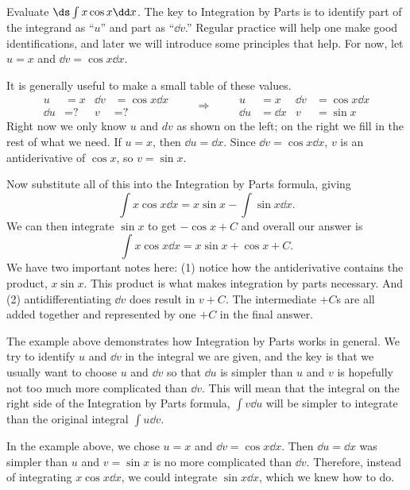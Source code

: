 \begin{example}\label{ex_ibp1}%
Evaluate $\ds\int x\cos{x}\dd x$.
\solution
The key to Integration by Parts is to identify part of the integrand as ``$u$'' and part as ``$\dd v$.'' Regular practice will help one make good identifications, and later we will introduce some principles that help. For now, let  $u=x$ and $\dd v=\cos x\dd x$.

It is generally useful to make a small table of these values.
\[
\begin{aligned}
u&= x & \dd v&=\cos x\dd x\\
\dd u&= \text{?} & v&=\text{?}
\end{aligned}
\qquad\Rightarrow\qquad
\begin{aligned}
u&= x & \dd v&=\cos x\dd x\\
\dd u&= \dd x & v&=\sin x
\end{aligned}
\]
Right now we only know $u$ and $dv$ as shown on the left; on the right we fill in the rest of what we need. If $u = x$, then $\dd u = \dd x$. Since $\dd v = \cos x\dd x$, $v$ is an antiderivative of $\cos x$, so $v = \sin x$.

Now substitute all of this into the Integration by Parts formula, giving
\[\int x\cos x\dd x = x\sin x - \int \sin x\dd x.\]
We can then integrate $\sin x$ to get $-\cos x + C$ and overall our answer is
\[\int x\cos x\dd x = x\sin x + \cos x + C.\]
We have two important notes here: (1) notice how the antiderivative contains the product, $x\sin x$. This product is what makes integration by parts necessary. And (2) antidifferentiating $\dd v$ does result in $v+C$. The intermediate $+C$s are all added together and represented by one $+C$ in the final answer.
\end{example}

The example above demonstrates how Integration by Parts works in general.  We try to identify $u$ and $\dd v$ in the integral we are given, and the key is that we usually want to choose $u$ and $\dd v$ so that $\dd u$ is simpler than $u$ and $v$ is hopefully not too much more complicated than $\dd v$.  This will mean that the integral on the right side of the Integration by Parts formula, $\int v\dd u$ will be simpler to integrate than the original integral $\int u\dd v$.

In the example above, we chose $u=x$ and $\dd v=\cos x\dd x$.  Then $\dd u=\dd x$ was simpler than $u$ and $v=\sin x$ is no more complicated than $\dd v$.  Therefore, instead of integrating $x\cos x\dd x$, we could integrate $\sin x\dd x$, which we knew how to do.

